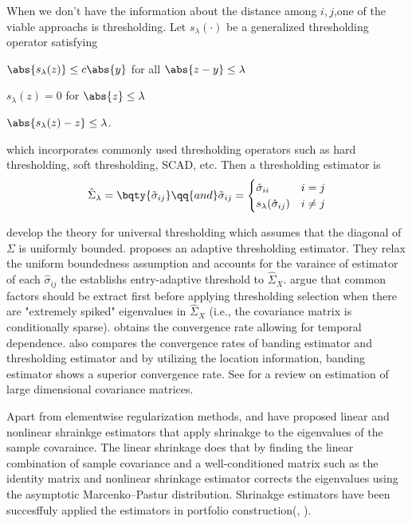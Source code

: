 When we don't have the information about the distance among \(i,j\),one of the viable approachs is thresholding. Let \(s_{\lambda}(\cdot)\) be a generalized thresholding operator satisfying 
\begin{enumerate*}
    \item \(\abs{s_{\lambda}(z)} \leq c \abs{y}\) for all \(\abs{z - y}\leq \lambda\)
    \item \(s_{\lambda}(z) = 0\) for \(\abs{z}\leq \lambda\)
    \item \(\abs{s_{\lambda}(z) - z} \leq \lambda\).
\end{enumerate*}
which incorporates commonly used thresholding operators such as hard thresholding, soft thresholding, SCAD, etc. Then a thresholding estimator is 
\begin{equation*}
    \hat{\Sigma}_{\lambda} = \bqty{\tilde{\sigma}_{ij}} \qq{and} \tilde{\sigma}_{ij}= 
    \begin{cases}
        \hat{\sigma}_{ii}   & i=j \\ 
        s_{\lambda}(\hat{\sigma}_{ij})  & i\neq j 
    \end{cases}
\end{equation*}

\cite{bickel2008CovarianceRegularization} develop the theory for universal thresholding which assumes that the diagonal of \(\Sigma\) is uniformly bounded. \cite{cai2011AdaptiveThresholding} proposes an adaptive thresholding estimator. They relax the uniform boundedness assumption and accounts for the varaince of estimator of each \(\hat{\sigma}_{ij}\) the establishs entry-adaptive threshold to ${\hat{\Sigma}_{X}}$. \cite{fan2013large} argue that common factors should be extract first before applying thresholding selection when there are "extremely spiked" eigenvalues in ${\hat{\Sigma}_{X}}$ (i.e., the covariance matrix is conditionally sparse). \cite{shu2019EstimationLarge} obtains the convergence rate allowing for temporal dependence. \cite{bickel2008CovarianceRegularization} also compares the convergence rates of banding estimator and thresholding estimator and by utilizing the location information, banding estimator shows a superior convergence rate. See \cite{fan2015OverviewEstimation} for a review on estimation of large dimensional covariance matrices. 

Apart from elementwise regularization methods, \cite{ledoit2004WellconditionedEstimator} and \cite{ledoit2012NonlinearShrinkage} have proposed linear and nonlinear shrainkge estimators that apply shrinakge to the eigenvalues of the sample covaraince.  The linear shrinkage does that by finding the linear combination of sample covariance and a well-conditioned matrix such as the identity matrix and nonlinear shrinkage estimator corrects the eigenvalues using the asymptotic Marcenko–Pastur distribution. 
Shrinakge estimators have been succesffuly applied the estimators in portfolio construction(\cite{ledoit2004HoneyShrunk}, \cite{ledoit2017NonlinearShrinkage}).

